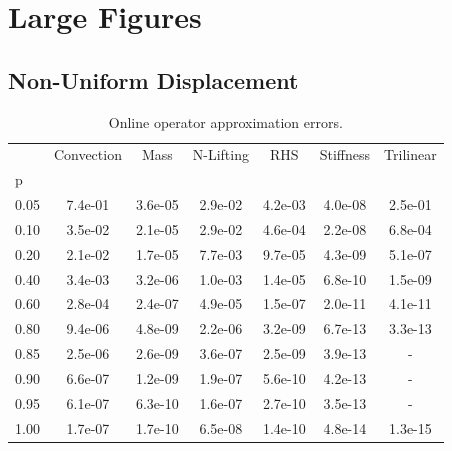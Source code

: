 \documentclass[../../thesis.tex]{subfiles}
\begin{document}
\section{Large Figures}


\subsection{Non-Uniform Displacement}

\begin{table}[h]
    \centering
    \caption{Online operator approximation errors.}
    \begin{tabular}{lcccccc}
        \toprule
        {} &  Convection &    Mass &  N-Lifting &     RHS &  Stiffness &  Trilinear   \\
        p    &             &         &                    &         &            &            \\
        \midrule
        0.05 &     7.4e-01 & 3.6e-05 &            2.9e-02 & 4.2e-03 &    4.0e-08 &    2.5e-01 \\
        0.10 &     3.5e-02 & 2.1e-05 &            2.9e-02 & 4.6e-04 &    2.2e-08 &    6.8e-04 \\
        0.20 &     2.1e-02 & 1.7e-05 &            7.7e-03 & 9.7e-05 &    4.3e-09 &    5.1e-07 \\
        0.40 &     3.4e-03 & 3.2e-06 &            1.0e-03 & 1.4e-05 &    6.8e-10 &    1.5e-09 \\
        0.60 &     2.8e-04 & 2.4e-07 &            4.9e-05 & 1.5e-07 &    2.0e-11 &    4.1e-11 \\
        0.80 &     9.4e-06 & 4.8e-09 &            2.2e-06 & 3.2e-09 &    6.7e-13 &    3.3e-13 \\
        0.85 &     2.5e-06 & 2.6e-09 &            3.6e-07 & 2.5e-09 &    3.9e-13 &        -   \\
        0.90 &     6.6e-07 & 1.2e-09 &            1.9e-07 & 5.6e-10 &    4.2e-13 &        -   \\
        0.95 &     6.1e-07 & 6.3e-10 &            1.6e-07 & 2.7e-10 &    3.5e-13 &        -   \\
        1.00 &     1.7e-07 & 1.7e-10 &            6.5e-08 & 1.4e-10 &    4.8e-14 &    1.3e-15 \\
        \bottomrule
    \end{tabular}       
    \label{tab:arbitrary_displacement_errors_online}
\end{table}
\end{document}
